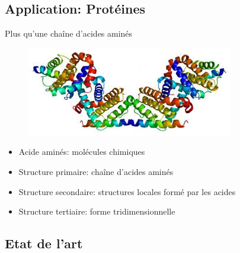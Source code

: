 \documentclass{beamer}
\begin{document}
\subsection{Application: Protéines}

\begin{frame}{Plus qu'une chaîne d'acides aminés}
  \begin{figure}
    \centering
    \includegraphics[scale=0.3]{../Figures/prot}
  \end{figure}
    \begin{itemize}
    \item Acide aminés: molécules chimiques
    \item Structure primaire: chaîne d'acides aminés
    \item Structure secondaire: structures locales formé par les acides
    \item Structure tertiaire: forme tridimensionnelle
    \end{itemize}
\end{frame}

\subsection{Etat de l'art}
\end{document}
